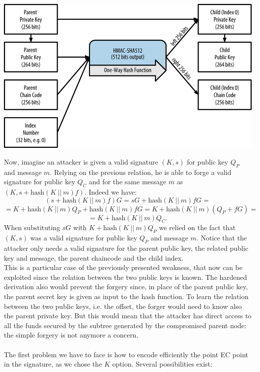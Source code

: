 \begin{center}
	\includegraphics[scale = 0.4]{Images/bip32.png}
	\label{fig:bip32}
\end{center}
Now, imagine an attacker is given a valid signature $(K, s)$ for public key $Q_P$ and message $m$. Relying on the previous relation, he is able to forge a valid signature for public key $Q_C$ and for the same message $m$ as $(K, s + \text{hash}(K \ || \ m)f)$. Indeed we have:
$$(s + \text{hash}(K \ || \ m)f)G = sG + \text{hash}(K \ || \ m)fG = $$
$$= K + \text{hash}(K \ || \ m)Q_P + \text{hash}(K \ || \ m)fG = K + \text{hash}(K \ || \ m)(Q_P + fG) = $$
$$ = K + \text{hash}(K \ || \ m)Q_C.$$
When substituting $sG$ with $K + \text{hash}(K \ || \ m)Q_P$ we relied on the fact that $(K, s)$ was a valid signature for public key $Q_P$ and message $m$. Notice that the attacker only needs a valid signature for the parent public key, the related public key and message, the parent chaincode and the child index.
\\
This is a particular case of the previously presented weakness, that now can be exploited since the relation between the two public keys is known. The hardened derivation also would prevent the forgery since, in place of the parent public key, the parent secret key is given as input to the hash function. To learn the relation between the two public keys, i.e. the offset, the forger would need to know also the parent private key. But this would mean that the attacker has direct access to all the funds secured by the subtree generated by the compromised parent node: the simple forgery is not anymore a concern.
\\
\\
The first problem we have to face is how to encode efficiently the point EC point in the signature, as we chose the $K$ option. Several possibilities exist:
